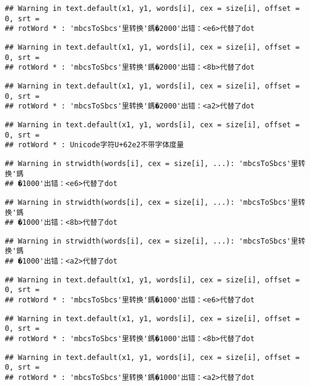 \documentclass[]{article}
\begin{document}
\begin{verbatim}
## Warning in text.default(x1, y1, words[i], cex = size[i], offset = 0, srt =
## rotWord * : 'mbcsToSbcs'里转换'鎷�2000'出错：<e6>代替了dot
\end{verbatim}

\begin{verbatim}
## Warning in text.default(x1, y1, words[i], cex = size[i], offset = 0, srt =
## rotWord * : 'mbcsToSbcs'里转换'鎷�2000'出错：<8b>代替了dot
\end{verbatim}

\begin{verbatim}
## Warning in text.default(x1, y1, words[i], cex = size[i], offset = 0, srt =
## rotWord * : 'mbcsToSbcs'里转换'鎷�2000'出错：<a2>代替了dot
\end{verbatim}

\begin{verbatim}
## Warning in text.default(x1, y1, words[i], cex = size[i], offset = 0, srt =
## rotWord * : Unicode字符U+62e2不带字体度量
\end{verbatim}

\begin{verbatim}
## Warning in strwidth(words[i], cex = size[i], ...): 'mbcsToSbcs'里转换'鎷
## �1000'出错：<e6>代替了dot
\end{verbatim}

\begin{verbatim}
## Warning in strwidth(words[i], cex = size[i], ...): 'mbcsToSbcs'里转换'鎷
## �1000'出错：<8b>代替了dot
\end{verbatim}

\begin{verbatim}
## Warning in strwidth(words[i], cex = size[i], ...): 'mbcsToSbcs'里转换'鎷
## �1000'出错：<a2>代替了dot
\end{verbatim}

\begin{verbatim}
## Warning in text.default(x1, y1, words[i], cex = size[i], offset = 0, srt =
## rotWord * : 'mbcsToSbcs'里转换'鎷�1000'出错：<e6>代替了dot
\end{verbatim}

\begin{verbatim}
## Warning in text.default(x1, y1, words[i], cex = size[i], offset = 0, srt =
## rotWord * : 'mbcsToSbcs'里转换'鎷�1000'出错：<8b>代替了dot
\end{verbatim}

\begin{verbatim}
## Warning in text.default(x1, y1, words[i], cex = size[i], offset = 0, srt =
## rotWord * : 'mbcsToSbcs'里转换'鎷�1000'出错：<a2>代替了dot
\end{verbatim}
\end{document}
